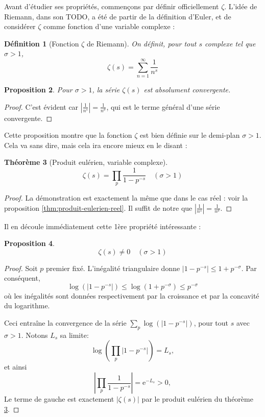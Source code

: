 \documentclass[french]{report}
\newtheorem{theorem}{Théorème}[section]
\newtheorem{definition}[theorem]{Définition}
\newtheorem{proposition}[theorem]{Proposition}
\begin{document}
Avant d'étudier ses propriétés, commençons par définir officiellement $\zeta$. L'idée de Riemann, dans son TODO, a été de partir de la définition d'Euler, et de considérer $\zeta$ comme fonction d'une variable complexe :

\begin{definition}[Fonction $\zeta$ de Riemann]\label{def:zeta-definition}
  On définit, pour tout $s$ complexe tel que $\sigma > 1$,
  \[ \zeta(s) = \sum_{n=1}^{\infty}\frac{1}{n^s} \]
\end{definition}

\begin{proposition}
  Pour $\sigma > 1$, la série $\zeta(s)$ est absolument convergente.
\end{proposition}

\begin{proof}
  C'est évident car $|\frac{1}{n^s}| = \frac{1}{n^{\sigma}}$, qui est le terme général d'une série convergente.
\end{proof}

Cette proposition montre que la fonction $\zeta$ est bien définie sur le demi-plan $\sigma > 1$.
\\

Cela va sans dire, mais cela ira encore mieux en le disant :

\begin{theorem}[Produit eulérien, variable complexe]\label{thm:produit-eulerien-complexe}
  \[ \zeta(s) = \prod_p\frac{1}{1-p^{-s}}\quad(\sigma>1)\]
\end{theorem}

\begin{proof}
  La démonstration est exactement la même que dans le cas réel : voir la proposition \ref{thm:produit-eulerien-reel}. Il suffit de notre que $|\frac{1}{n^s}|=\frac{1}{n^\sigma}$.
\end{proof}

Il en découle immédiatement cette 1ère propriété intéressante :

\begin{proposition}\label{eq:zeta-non-nul-produit-eulerien}
  \[ \zeta(s) \neq 0 \quad(\sigma > 1)\]
\end{proposition}

\begin{proof}
  Soit $p$ premier fixé. L'inégalité triangulaire donne $|1-p^{-s}|\leq1+p^{-\sigma}$. Par conséquent,
  \[\log(|1-p^{-s}|)\leq\log(1+p^{-\sigma})\leq p^{-\sigma} \]
  où les inégalités sont données respectivement par la croissance et par la concavité du logarithme.

  Ceci entraîne la convergence de la série $\sum_p\log(|1-p^{-s}|)$, pour tout $s$ avec $\sigma>1$. Notons $L_s$ sa limite:
  \[ \log\left(\prod_p|1-p^{-s}|\right) = L_s, \]
  et ainsi
  \[ \left|\prod_p\frac{1}{1-p^{-s}}\right| = \mathrm{e}^{-L_s} > 0, \]
  Le terme de gauche est exactement $|\zeta(s)|$ par le produit eulérien du théorème \ref{thm:produit-eulerien-complexe}.

\end{proof}
\end{document}
